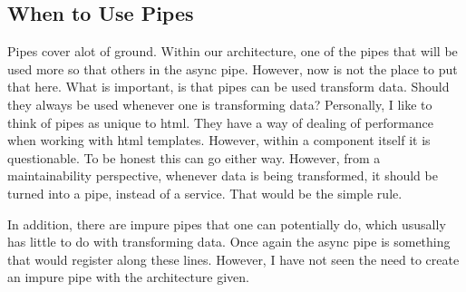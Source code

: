 \subsection{ When to Use Pipes }
Pipes cover alot of ground. Within our architecture, one of the pipes that will
be used more so that others in the async pipe. However, now is not the place
to put that here. What is important, is that pipes can be used transform data.
Should they always be used whenever one is transforming data? Personally,
I like to think of pipes as unique to html. They have a way of dealing of
performance when working with html templates. However, within a component
itself it is questionable. To be honest this can go either way. However, from a
maintainability perspective, whenever data is being transformed, it should be
turned into a pipe, instead of a service. That would be the simple rule.

In addition, there are impure pipes that one can potentially do, which ususally
has little to do with transforming data. Once again the async pipe is something
that would register along these lines. However, I have not seen the need to
create an impure pipe with the architecture given. 
